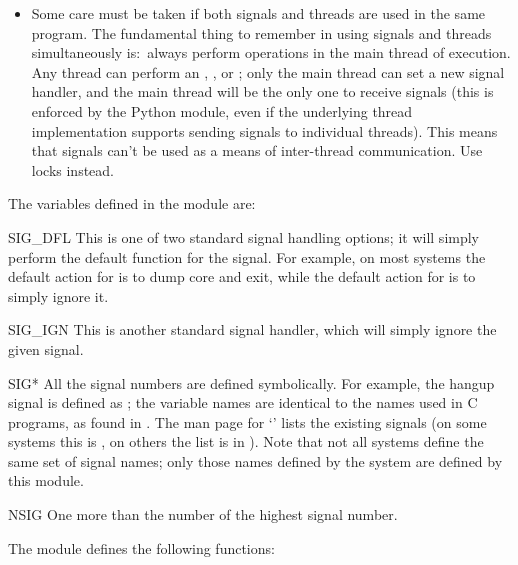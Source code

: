 \begin{itemize}
\item
Some care must be taken if both signals and threads are used in the
same program.  The fundamental thing to remember in using signals and
threads simultaneously is:\ always perform  operations
in the main thread of execution.  Any thread can perform an
, , or ;
only the main thread can set a new signal handler, and the main thread
will be the only one to receive signals (this is enforced by the
Python  module, even if the underlying thread
implementation supports sending signals to individual threads).  This
means that signals can't be used as a means of inter-thread
communication.  Use locks instead.

\end{itemize}

The variables defined in the  module are:

\begin{datadesc}{SIG_DFL}
  This is one of two standard signal handling options; it will simply
  perform the default function for the signal.  For example, on most
  systems the default action for  is to dump core
  and exit, while the default action for  is to
  simply ignore it.
\end{datadesc}

\begin{datadesc}{SIG_IGN}
  This is another standard signal handler, which will simply ignore
  the given signal.
\end{datadesc}

\begin{datadesc}{SIG*}
  All the signal numbers are defined symbolically.  For example, the
  hangup signal is defined as ; the variable names
  are identical to the names used in C programs, as found in
  .
  The \UNIX{} man page for `' lists the existing
  signals (on some systems this is , on others the
  list is in ).
  Note that not all systems define the same set of signal names; only
  those names defined by the system are defined by this module.
\end{datadesc}

\begin{datadesc}{NSIG}
  One more than the number of the highest signal number.
\end{datadesc}

The  module defines the following functions:


